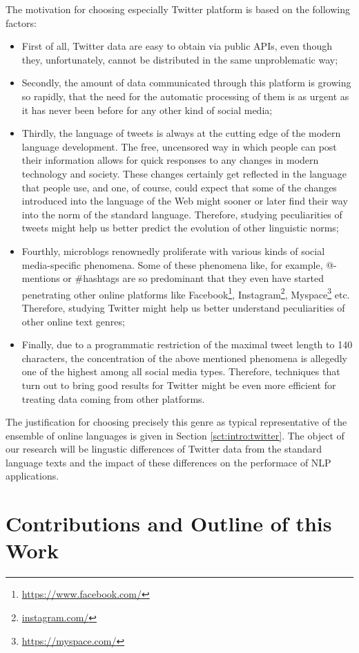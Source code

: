 The motivation for choosing especially Twitter platform is based on the
following factors:
\begin{itemize}
  \item First of all, Twitter data are easy to obtain via public APIs, even
    though they, unfortunately, cannot be distributed in the same
    unproblematic way;
  \item Secondly, the amount of data communicated through this platform is
    growing so rapidly, that the need for the automatic processing of them is
    as urgent as it has never been before for any other kind of social media;
  \item Thirdly, the language of tweets is always at the cutting edge of the
    modern language development.  The free, uncensored way in which people can
    post their information allows for quick responses to any changes in modern
    technology and society.  These changes certainly get reflected in the
    language that people use, and one, of course, could expect that some of
    the changes introduced into the language of the Web might sooner or later
    find their way into the norm of the standard language.  Therefore,
    studying peculiarities of tweets might help us better predict the
    evolution of other linguistic norms;
  \item Fourthly, microblogs renownedly proliferate with various kinds of
    social media-specific phenomena.  Some of these phenomena like, for
    example, @-mentions or \#hashtags are so predominant that they even have
    started penetrating other online platforms like
    Facebook\footnote{\url{https://www.facebook.com/}},
    Instagram\footnote{\url{instagram.com/}},
    Myspace\footnote{\url{https://myspace.com/}} etc.  Therefore, studying
    Twitter might help us better understand peculiarities of other online text
    genres;
  \item Finally, due to a programmatic restriction of the maximal tweet length
    to 140 characters, the concentration of the above mentioned phenomena is
    allegedly one of the highest among all social media types.  Therefore,
    techniques that turn out to bring good results for Twitter might be even
    more efficient for treating data coming from other platforms.
\end{itemize}

The justification for choosing precisely this genre as typical representative
of the ensemble of online languages is given in Section
\ref{sct:intro:twitter}.  The object of our research will be lingustic
differences of Twitter data from the standard language texts and the impact of
these differences on the performace of NLP applications.

\section{Contributions and Outline of this Work}
